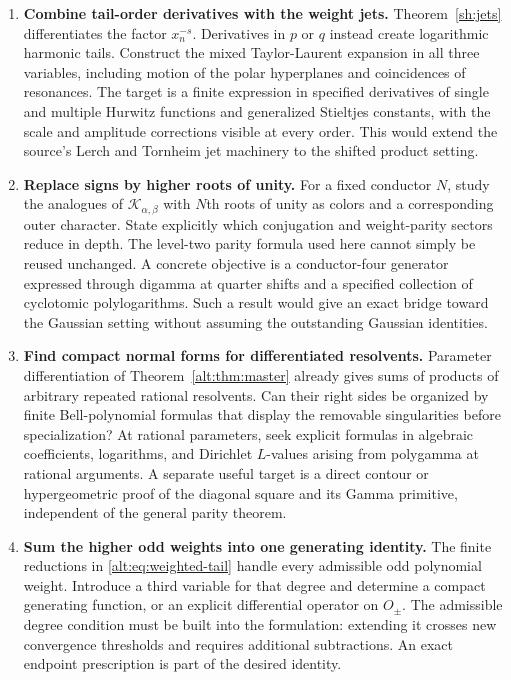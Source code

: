 \begin{enumerate}[label=\textbf{Q\arabic*.},ref=Q\arabic*,itemsep=10pt]
\item \textbf{Combine tail-order derivatives with the weight jets.}
Theorem~\ref{sh:jets} differentiates the factor $x_n^{-s}$.
Derivatives in $p$ or $q$ instead create logarithmic harmonic tails.
Construct the mixed Taylor-Laurent expansion in all three variables,
including motion of the polar hyperplanes and coincidences of
resonances. The target is a finite expression in specified derivatives
of single and multiple Hurwitz functions and generalized Stieltjes
constants, with the scale and amplitude corrections visible at every
order. This would extend the source's Lerch and Tornheim jet machinery
to the shifted product setting.

\item \textbf{Replace signs by higher roots of unity.}
For a fixed conductor $N$, study the analogues of
$\mathcal K_{\alpha,\beta}$ with $N$th roots of unity as colors
and a corresponding outer character. State explicitly which
conjugation and weight-parity sectors reduce in depth. The level-two
parity formula used here cannot simply be reused unchanged. A
concrete objective is a conductor-four generator expressed through
digamma at quarter shifts and a specified collection of cyclotomic
polylogarithms. Such a result would give an exact bridge toward the
Gaussian setting without assuming the outstanding Gaussian identities.

\item \textbf{Find compact normal forms for differentiated resolvents.}
Parameter differentiation of Theorem~\ref{alt:thm:master} already
gives sums of products of arbitrary repeated rational resolvents.
Can their right sides be organized by finite Bell-polynomial formulas
that display the removable singularities before specialization?
At rational parameters, seek explicit formulas in algebraic
coefficients, logarithms, and Dirichlet $L$-values arising from
polygamma at rational arguments. A separate useful target is a direct
contour or hypergeometric proof of the diagonal square and its Gamma
primitive, independent of the general parity theorem.

\item \textbf{Sum the higher odd weights into one generating identity.}
The finite reductions in \eqref{alt:eq:weighted-tail} handle every
admissible odd polynomial weight. Introduce a third variable for
that degree and determine a compact generating function, or an
explicit differential operator on $O_\pm$. The admissible degree
condition must be built into the formulation: extending it crosses
new convergence thresholds and requires additional subtractions.
An exact endpoint prescription is part of the desired identity.


\end{enumerate}
